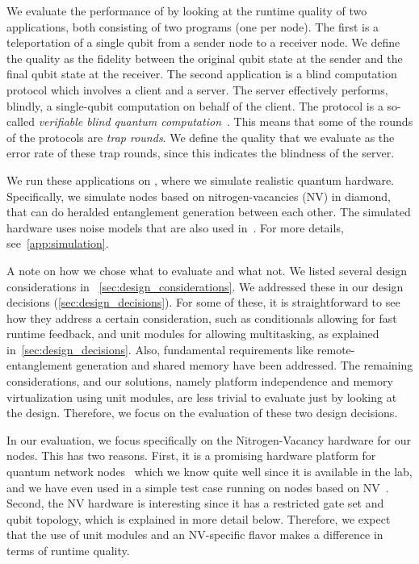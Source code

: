 We evaluate the performance of \netqasm by looking at the runtime quality of two applications, both consisting of two programs (one per node).
The first is a teleportation of a single qubit from a sender node to a receiver node.
We define the quality as the fidelity between the original qubit state at the sender and the final qubit state at the receiver.
The second application is a blind computation protocol which involves a client and a server.
The server effectively performs, blindly, a single-qubit computation on behalf of the client.
The protocol is a so-called \textit{verifiable blind quantum computation}~\cite{fitzsimons2017unconditionally}.
This means that some of the rounds of the protocols are \textit{trap rounds}.
We define the quality that we evaluate as the error rate of these trap rounds, since this indicates the blindness of the server.

We run these applications on \squidasm, where we simulate realistic quantum hardware.
Specifically, we simulate nodes based on nitrogen-vacancies (NV) in diamond, that can do heralded entanglement generation between each other.
The simulated hardware uses noise models that are also used in~\cite{coopmans2021netsquid}.
For more details, see~\cref{app:simulation}.

A note on how we chose what to evaluate and what not.
We listed several design considerations in ~\cref{sec:design_considerations}.
We addressed these in our design decisions (\cref{sec:design_decisions}).
For some of these, it is straightforward to see how they address a certain consideration, such as conditionals allowing for fast runtime feedback, and unit modules for allowing multitasking, as explained in~\cref{sec:design_decisions}.
Also, fundamental requirements like remote-entanglement generation and shared memory have been addressed.
The remaining considerations, and our solutions, namely platform independence and memory virtualization using unit modules, are less trivial to evaluate just by looking at the design.
Therefore, we focus on the evaluation of these two design decisions.

In our evaluation, we focus specifically on the Nitrogen-Vacancy hardware for our nodes.
This has two reasons.
First, it is a promising hardware platform for quantum network nodes~\cite{Taminiau2014} which we know quite well since it is available in the lab, and we have even used \netqasm in a simple test case running on nodes based on NV~\cite{pompili2021experimental}.
Second, the NV hardware is interesting since it has a restricted gate set and qubit topology, which is explained in more detail below.
Therefore, we expect that the use of unit modules and an NV-specific flavor makes a difference in terms of runtime quality.

